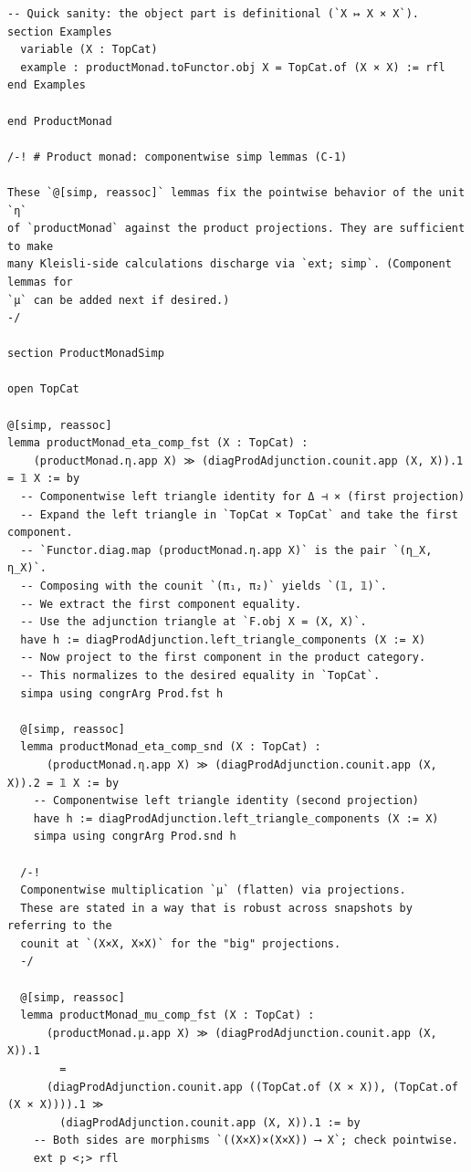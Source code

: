 \documentclass[12pt]{article}
\theoremstyle{definition}
\begin{document}
\begin{lstlisting}
-- Quick sanity: the object part is definitional (`X ↦ X × X`).
section Examples
  variable (X : TopCat)
  example : productMonad.toFunctor.obj X = TopCat.of (X × X) := rfl
end Examples

end ProductMonad

/-! # Product monad: componentwise simp lemmas (C‑1)

These `@[simp, reassoc]` lemmas fix the pointwise behavior of the unit `η`
of `productMonad` against the product projections. They are sufficient to make
many Kleisli-side calculations discharge via `ext; simp`. (Component lemmas for
`μ` can be added next if desired.)
-/

section ProductMonadSimp

open TopCat

@[simp, reassoc]
lemma productMonad_eta_comp_fst (X : TopCat) :
    (productMonad.η.app X) ≫ (diagProdAdjunction.counit.app (X, X)).1 = 𝟙 X := by
  -- Componentwise left triangle identity for Δ ⊣ × (first projection)
  -- Expand the left triangle in `TopCat × TopCat` and take the first component.
  -- `Functor.diag.map (productMonad.η.app X)` is the pair `(η_X, η_X)`.
  -- Composing with the counit `(π₁, π₂)` yields `(𝟙, 𝟙)`.
  -- We extract the first component equality.
  -- Use the adjunction triangle at `F.obj X = (X, X)`.
  have h := diagProdAdjunction.left_triangle_components (X := X)
  -- Now project to the first component in the product category.
  -- This normalizes to the desired equality in `TopCat`.
  simpa using congrArg Prod.fst h

  @[simp, reassoc]
  lemma productMonad_eta_comp_snd (X : TopCat) :
      (productMonad.η.app X) ≫ (diagProdAdjunction.counit.app (X, X)).2 = 𝟙 X := by
    -- Componentwise left triangle identity (second projection)
    have h := diagProdAdjunction.left_triangle_components (X := X)
    simpa using congrArg Prod.snd h

  /-!
  Componentwise multiplication `μ` (flatten) via projections.
  These are stated in a way that is robust across snapshots by referring to the
  counit at `(X×X, X×X)` for the "big" projections.
  -/

  @[simp, reassoc]
  lemma productMonad_mu_comp_fst (X : TopCat) :
      (productMonad.μ.app X) ≫ (diagProdAdjunction.counit.app (X, X)).1
        =
      (diagProdAdjunction.counit.app ((TopCat.of (X × X)), (TopCat.of (X × X)))).1 ≫
        (diagProdAdjunction.counit.app (X, X)).1 := by
    -- Both sides are morphisms `((X×X)×(X×X)) ⟶ X`; check pointwise.
    ext p <;> rfl


\end{lstlisting}
\end{document}
